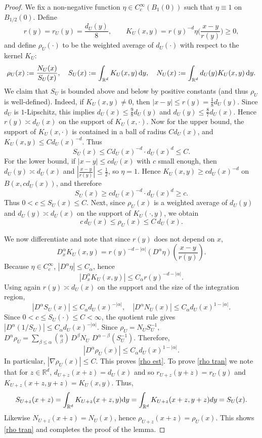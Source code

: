\documentclass[11pt]{article}
\renewcommand{\d}{{\rm d}}
\newcommand{\R}{\mathbb R}
\theoremstyle{rem}
\begin{document}
\begin{proof}
We fix a non-negative function $\eta\in C^\infty_c(B_1(0))$ such that $\eta\equiv 1$ 
on $B_{1/2}(0)$. Define 
$$
r(y)= r_U(y)=  \frac{d_U(y)}{8}, \qquad K_U(x,y)= r(y)^{-d} \eta \bigg(\frac{x-y}{r(y)}\bigg)\geq 0,
$$
and define $\rho_U(\cdot)$ to be the weighted average of $d_U(\cdot)$ with respect to the kernel $K_U$:
$$
\rho_U(x):=\frac{N_U(x)}{S_U(x)}, \quad S_U(x):=\int_{\R^d} K_U(x,y)\, \d y, \quad N_U(x):=\int_{\R^d} d_U(y)K_U(x,y)\,\d y.
$$
We claim that $S_U$ is bounded above and below by positive constants (and thus $\rho_U$ is well-defined).  Indeed, if $K_U(x,y)\neq 0$, then
$|x-y|\le r(y)=\tfrac18 d_U(y)$. Since $d_U$ is $1$-Lipschitz, this implies
$d_U(x)\le \tfrac98 d_U(y)$ and
$d_U(y)\le \tfrac87 d_U(x)$. Hence $r(y)\asymp d_U(x)$ on the support of $K_U(x,\cdot)$.
Now for the upper bound, the support of $K_U(x,\cdot)$ is contained in a ball of radius $C d_U(x)$, and
$K_U(x,y)\le C d_U(x)^{-d}$. Thus
\[
S_U(x)\le C d_U(x)^{-d}\cdot d_U(x)^d \le C.
\]
For the lower bound, if $|x-y|\le c d_U(x)$ with $c$ small enough, then $d_U(y)\asymp d_U(x)$ and
$|\frac{x-y}{r(y)}|\le \tfrac12$,
so $\eta=1$. Hence $K_U(x,y)\ge c d_U(x)^{-d}$
on $B(x,c d_U(x))$, and therefore
\[
S_U(x)\ge c d_U(x)^{-d}\cdot d_U(x)^d \ge c.
\]
Thus $0<c\le S_U(x)\le C$. Next, since $\rho_U(x)$ is a weighted average of $d_U(y)$ and $d_U(y)\asymp d_U(x)$ on the support of $K_U(\cdot,y)$, we obtain
\[
c\,d_U(x)\le \rho_U(x)\le C\,d_U(x).
\]

We now differentiate and note that since $r(y)$ does not depend on $x$,
\[
D_x^\alpha K_U(x,y)
=
r(y)^{-d-|\alpha|}(D^\alpha\eta)\!\left(\frac{x-y}{r(y)}\right).
\]
Because $\eta\in C_c^\infty$, $|D^\alpha\eta|\le C_\alpha$, hence
\[
|D_x^\alpha K_U(x,y)|\le C_\alpha r(y)^{-d-|\alpha|}.
\]
Using again $r(y)\asymp d_U(x)$ on the support and the size of the integration region,
\[
|D^\alpha S_U(x)|\le C_\alpha d_U(x)^{-|\alpha|},
\quad
|D^\alpha N_U(x)|\le C_\alpha d_U(x)^{1-|\alpha|}.
\]
Since $0<c\leq S_U(\cdot)\leq C <\infty$, the quotient rule gives $|D^\alpha (1/S_U)|\leq C_\alpha d_U(x)^{-|\alpha|}$. Since $\rho_U= N_U S_U^{-1}$, $D^\alpha\rho_U= \sum_{\beta \leq \alpha} \binom{\alpha}{\beta}\, D^\beta N_U \,\, D^{\alpha-\beta}(S_U^{-1})$. Therefore, 
\[
|D^\alpha \rho_U(x)|\le C_\alpha d_U(x)^{1-|\alpha|}.
\]
In particular, $|\nabla \rho_U(x)|\le C$. This proves \eqref{rho est}. To prove \eqref{rho tran}
we note that for $z\in\mathbb R^d$,
$d_{U+z}(x+z)=d_U(x)$ and so  $r_{U+z}(y+z)=r_U(y)$ and 
$K_{U+z}(x+z,y+z)=K_U(x,y)$. Thus,  
\[
S_{U+z}(x+z)= \int_{\R^d}K_{U+z} (x+z,y) \d y= \int_{\R^d} K_{U+z} (x+z,y+z) dy= S_U(x).
\]
Likewise $N_{U+z}(x+z)=N_U(x)$, hence
$\rho_{U+z}(x+z)=\rho_U(x)$. This shows \eqref{rho tran} and completes the proof of the lemma. 
\end{proof}
\end{document}
